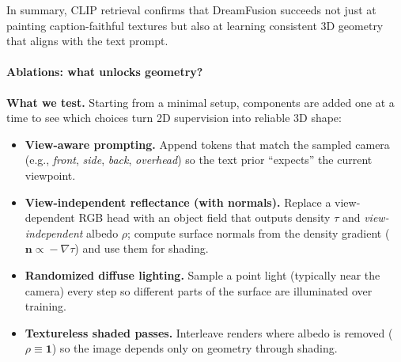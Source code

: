 \begin{enrichment}
\begin{enrichment}
        \noindent
        In summary, CLIP retrieval confirms that DreamFusion succeeds not just at painting caption-faithful textures but also at learning consistent 3D geometry that aligns with the text prompt.
        
        \newpage
        
        \paragraph{Ablations: what unlocks geometry?}
        \label{par:chapter23_dreamfusion_ablations}
        
        \textbf{What we test.} Starting from a minimal setup, components are added one at a time to see which choices turn 2D supervision into reliable 3D shape:
        \begin{itemize}
            \item \textbf{View-aware prompting.} Append tokens that match the sampled camera (e.g., \emph{front}, \emph{side}, \emph{back}, \emph{overhead}) so the text prior “expects” the current viewpoint.
            \item \textbf{View-independent reflectance (with normals).} Replace a view-dependent RGB head with an object field that outputs density $\tau$ and \emph{view-independent} albedo $\rho$; compute surface normals from the density gradient ($\mathbf{n}\!\propto\!-\nabla\tau$) and use them for shading.
            \item \textbf{Randomized diffuse lighting.} Sample a point light (typically near the camera) every step so different parts of the surface are illuminated over training.
            \item \textbf{Textureless shaded passes.} Interleave renders where albedo is removed ($\rho\equiv\mathbf{1}$) so the image depends only on geometry through shading.
        \end{itemize}
        

\end{enrichment}
\end{enrichment}
